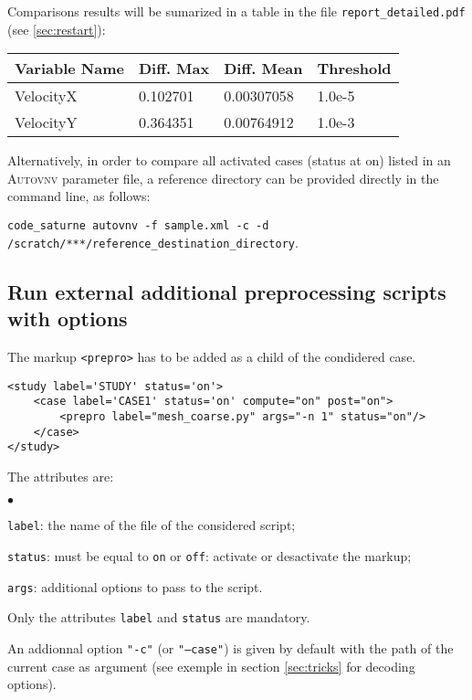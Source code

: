 \documentclass[a4paper,10pt,twoside]{csshortdoc}
\begin{document}
Comparisons results will be sumarized in a table in the file
\texttt{report\_detailed.pdf}  (see \ref{sec:restart}):

\begin{center}
\begin{longtable}{|l|l|l|l|}
\hline
\textbf{Variable Name} &\textbf{Diff. Max} &\textbf{Diff. Mean} &\textbf{Threshold} \\
\hline
\hline
VelocityX &0.102701 &0.00307058 &1.0e-5 \\
\hline
VelocityY &0.364351 &0.00764912 &1.0e-3 \\
\hline
\end{longtable}
\end{center}

Alternatively, in order to compare all activated cases (status at on) listed
in an \textsc{Autovnv} parameter file, a reference directory can be provided
directly in the command line, as follows:

\texttt{code\_saturne autovnv -f sample.xml -c -d /scratch/***/reference\_destination\_directory}.

\subsection{Run external additional preprocessing scripts with options}\label{sec:prepro}

The markup \texttt{<prepro>} has to be added as a child of the condidered case.

\small
\begin{verbatim}
<study label='STUDY' status='on'>
    <case label='CASE1' status='on' compute="on" post="on">
        <prepro label="mesh_coarse.py" args="-n 1" status="on"/>
    </case>
</study>
\end{verbatim}
\normalsize

The attributes are:
\begin{list}{$\bullet$}{}
\item \texttt{label}: the name of the file of the considered script;
\item \texttt{status}: must be equal to \texttt{on} or \texttt{off}:
activate or desactivate the markup;
\item \texttt{args}: additional options to pass to the script.
\end{list}

Only the attributes \texttt{label} and \texttt{status} are mandatory.

An addionnal option \texttt{"-c"} (or \texttt{"--case"}) is given by
default with the path of the current case as argument (see exemple in
section \ref{sec:tricks} for decoding options).
\end{document}
